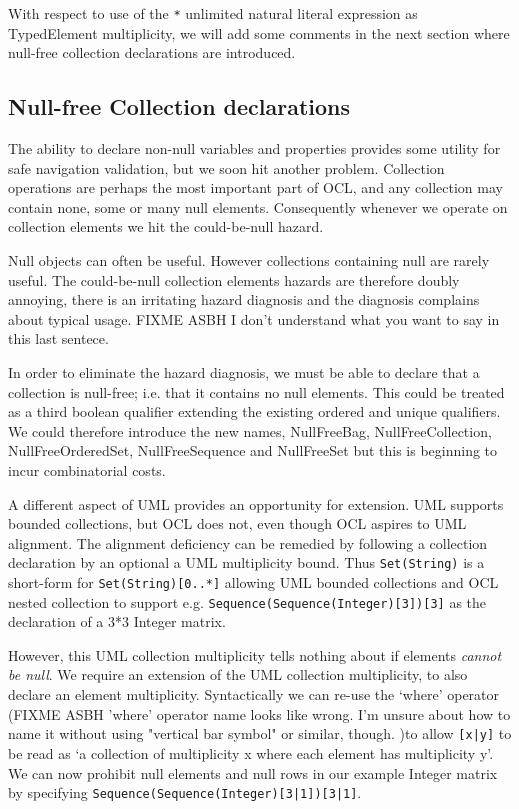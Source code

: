 \documentclass{llncs}
\begin{document}
With respect to use of the \verb|*| unlimited natural literal expression as TypedElement multiplicity, we will add some comments in the next section where null-free collection declarations are introduced.

\subsection{Null-free Collection declarations}

The ability to declare non-null variables and properties provides some utility for safe navigation validation, but we soon hit another problem. Collection operations are perhaps the most important part of OCL, and any collection may contain none, some or many null elements. Consequently whenever we operate on collection elements we hit the could-be-null hazard.

Null objects can often be useful. However collections containing null are rarely useful. The could-be-null collection elements hazards are therefore doubly annoying, there is an irritating hazard diagnosis and the diagnosis complains about typical usage. FIXME ASBH I don't understand what you want to say in this last sentece.

In order to eliminate the hazard diagnosis, we must be able to declare that a collection is null-free; i.e. that it contains no null elements. This could be treated as a third boolean qualifier extending the existing ordered and unique qualifiers. We could therefore introduce the new names, NullFreeBag, NullFreeCollection, NullFreeOrderedSet, NullFreeSequence and NullFreeSet but this is beginning to incur combinatorial costs.

A different aspect of UML provides an opportunity for extension. UML supports bounded collections, but OCL does not, even though OCL aspires to UML alignment. The alignment deficiency can be remedied by following a collection declaration by an optional a UML multiplicity bound. Thus \verb|Set(String)| is a short-form for \verb|Set(String)[0..*]| allowing UML bounded collections and OCL nested collection to support e.g. \verb|Sequence(Sequence(Integer)[3])[3]| as the declaration of a 3*3 Integer matrix.

However, this UML collection multiplicity tells nothing about if elements \textit{cannot be null}. We require an extension of the UML collection multiplicity, to also declare an element multiplicity. Syntactically we can re-use the `where' operator (FIXME ASBH 'where' operator name looks like wrong. I'm unsure about how to name it without using "vertical bar symbol" or similar, though. )to allow \verb$[x|y]$ to be read as `a collection of multiplicity x where each element has multiplicity y'. We can now prohibit null elements and null rows in our example Integer matrix by specifying \verb$Sequence(Sequence(Integer)[3|1])[3|1]$.
\end{document}
